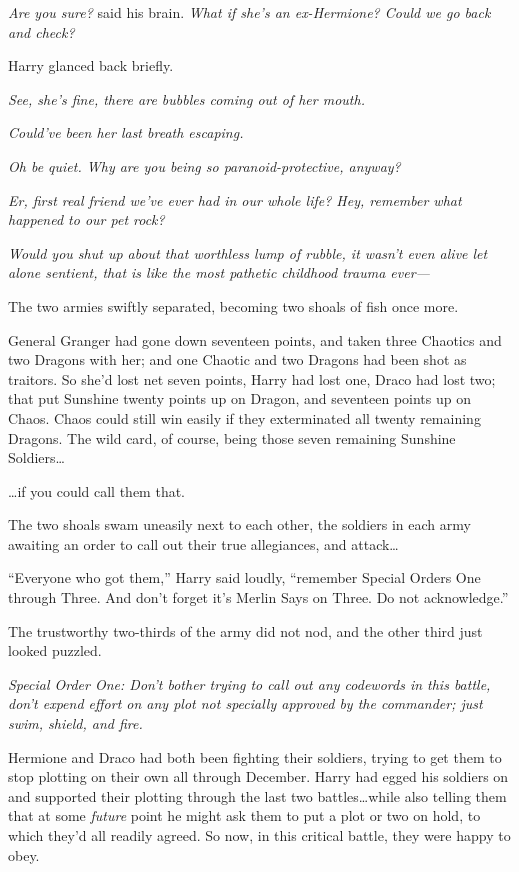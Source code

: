 \emph{Are you sure?} said his brain. \emph{What if she’s an ex-Hermione? Could we go back and check?}

Harry glanced back briefly.

\emph{See, she’s fine, there are bubbles coming out of her mouth.}

\emph{Could’ve been her last breath escaping.}

\emph{Oh be quiet. Why are you being so paranoid-protective, anyway?}

\emph{Er, first real friend we’ve ever had in our whole life? Hey, remember what happened to our pet rock?}

\emph{Would you \emph{shut up} about that worthless lump of rubble, it wasn’t even alive let alone sentient, that is like the most pathetic childhood trauma ever—}

The two armies swiftly separated, becoming two shoals of fish once more.

General Granger had gone down seventeen points, and taken three Chaotics and two Dragons with her; and one Chaotic and two Dragons had been shot as traitors. So she’d lost net seven points, Harry had lost one, Draco had lost two; that put Sunshine twenty points up on Dragon, and seventeen points up on Chaos. Chaos could still win easily if they exterminated all twenty remaining Dragons. The wild card, of course, being those seven remaining Sunshine Soldiers…

…if you could call them that.

The two shoals swam uneasily next to each other, the soldiers in each army awaiting an order to call out their true allegiances, and attack…

“Everyone who got them,” Harry said loudly, “remember Special Orders One through Three. And don’t forget it’s Merlin Says on Three. Do not acknowledge.”

The trustworthy two-thirds of the army did not nod, and the other third just looked puzzled.

\emph{Special Order One: Don’t bother trying to call out any codewords in this battle, don’t expend effort on any plot not specially approved by the commander; just swim, shield, and fire.}

Hermione and Draco had both been fighting their soldiers, trying to get them to stop plotting on their own all through December. Harry had egged his soldiers on and supported their plotting through the last two battles…while also telling them that at some \emph{future} point he might ask them to put a plot or two on hold, to which they’d all readily agreed. So now, in this critical battle, they were happy to obey.

